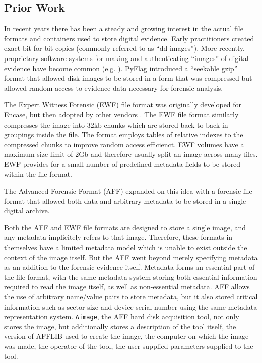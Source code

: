 \documentclass[10pt, conference]{IEEEtran}
\begin{document}
\subsection{Prior Work}
In recent years there has been a steady and growing interest in the
actual file formats and containers used to store digital
evidence. Early practitioners created exact bit-for-bit copies
(commonly referred to as ``dd images''). More recently, proprietary
software systems for making and authenticating ``images'' of digital
evidence have become common
(e.g. \cite{safeback,ilook,encase}). PyFlag\cite{pyflag} introduced a
``seekable gzip'' format that allowed disk images to be stored in a
form that was compressed but allowed random-access to evidence data
necessary for forensic analysis. 

The Expert Witness Forensic (EWF) file format was originally developed
for Encase\cite{encase}, but then adopted by other vendors
\cite{libewf}. The EWF file format similarly compresses the image into 32kb
chunks which are stored back to back in groupings inside the file. The
format employs tables of relative indexes to the
compressed chunks to improve random access efficienct. EWF volumes
have a maximum size limit of 2Gb and therefore usually split an image across
many files. EWF provides for a small number of predefined metadata
fields to be stored within the file format.

The Advanced Forensic Format (AFF) expanded on this idea with a
forensic file format that allowed both data and arbitrary metadata to
be stored in a single digital archive\cite{garfinkel:aff}. 

Both the AFF and EWF file formats are designed to store a single
image, and any metadata implicitely refers to that image. Therefore,
these formats in themselves have a limited metadata model which is
unable to exist outside the context of the image itself.  But the AFF went
beyond merely specifying metadata as an addition to the forensic
evidence itself. Metadata forms an essential part of the file format,
with the same metadata system storing both essential information
required to read the image itself, as well as non-essential
metadata. AFF allows the use of arbitrary name/value pairs to store
metadata, but it also stored critical information such as sector size
and device serial number using the same metadata representation
system. \verb+Aimage+, the AFF hard disk acquisition tool, not only
stores the image, but additionally stores a description of the tool
itself, the version of AFFLIB used to create the image, the computer
on which the image was made, the operator of the tool, the user
supplied parameters supplied to the tool.
\end{document}
